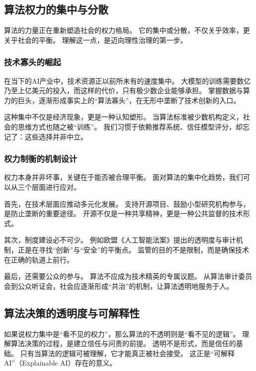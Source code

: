 \subsection{算法权力的集中与分散}

算法的力量正在重新塑造社会的权力格局。  
它的集中或分散，不仅关乎效率，更关乎社会的平衡。  
理解这一点，是迈向理性治理的第一步。

\subsubsection{技术寡头的崛起}

在当下的AI产业中，技术资源正以前所未有的速度集中。  
大模型的训练需要数亿乃至上亿美元的投入，而这样的代价，只有极少数企业能够承担。  
掌握数据与算力的巨头，逐渐形成事实上的“算法寡头”，在无形中垄断了技术创新的入口。

这种集中不仅是经济现象，更是一种认知塑形。  
当算法标准被少数机构定义，社会的思维方式也随之被“训练”。  
我们习惯于依赖推荐系统、信任模型评分，却忘记了：这些选择并非中立。

\subsubsection{权力制衡的机制设计}

权力本身并非坏事，关键在于能否被合理平衡。  
面对算法的集中化趋势，我们可以从三个层面进行应对。

首先，在技术层面应推动多元化发展。  
支持开源项目、鼓励小型研究机构参与，是防止垄断的重要途径。  
开源不仅是一种共享精神，更是一种公共监督的技术形式。

其次，制度建设必不可少。  
例如欧盟《人工智能法案》提出的透明度与审计机制，正是在寻找“创新”与“安全”的平衡点。  
监管的目的不是限制，而是确保技术在正确的轨道上前行。

最后，还需要公众的参与。  
算法不应成为技术精英的专属议题。  
从算法审计委员会到公众听证会，社会应逐渐形成“共治”的机制，让算法透明地服务于人。

\subsection{算法决策的透明度与可解释性}

如果说权力集中是“看不见的权力”，那么算法的不透明则是“看不见的逻辑”。  
理解算法决策的过程，是建立信任与问责的前提。  
透明不是形式，而是信任的基础。  
只有当算法的逻辑可被理解，它才能真正被社会接受。  
这正是“可解释AI”（Explainable AI）存在的意义。

